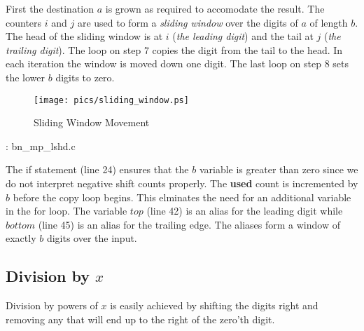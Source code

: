 \documentclass[b5paper]{book}
\begin{document}
First the destination $a$ is grown as required to accomodate the result.  The counters $i$ and $j$ are used to form a \textit{sliding window} over
the digits of $a$ of length $b$.  The head of the sliding window is at $i$ (\textit{the leading digit}) and the tail at $j$ (\textit{the trailing digit}).  
The loop on step 7 copies the digit from the tail to the head.  In each iteration the window is moved down one digit.   The last loop on 
step 8 sets the lower $b$ digits to zero.

\newpage
\begin{center}
\begin{figure}[here]
\texttt{[image: pics/sliding\_window.ps]}
\caption{Sliding Window Movement}
\label{pic:sliding_window}
\end{figure}
\end{center}

\vspace{+3mm}\begin{small}
\hspace{-5.1mm}{\bf File}: bn\_mp\_lshd.c
\vspace{-3mm}
\begin{alltt}
\end{alltt}
\end{small}

The if statement (line 24) ensures that the $b$ variable is greater than zero since we do not interpret negative
shift counts properly.  The \textbf{used} count is incremented by $b$ before the copy loop begins.  This elminates 
the need for an additional variable in the for loop.  The variable $top$ (line 42) is an alias
for the leading digit while $bottom$ (line 45) is an alias for the trailing edge.  The aliases form a 
window of exactly $b$ digits over the input.  

\subsection{Division by $x$}

Division by powers of $x$ is easily achieved by shifting the digits right and removing any that will end up to the right of the zero'th digit.  
\end{document}
